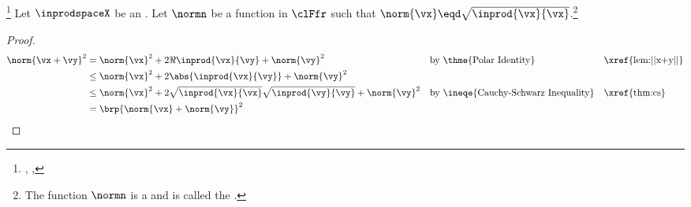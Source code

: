 \begin{theorem}
\footnote{
  ,
  ,
  }
Let $\inprodspaceX$ be an .
Let $\normn$ be a function in $\clFfr$ such that $\norm{\vx}\eqd\sqrt{\inprod{\vx}{\vx}}$.\footnote{
The function $\normn$ is a   and is called the 
.}
\thmbox{
  \norm{\vx+\vy} \le \norm{\vx}+\norm{\vy}
  \quad\sst
  \forall \vx,\vy\in\setX
  }
\end{theorem}
\begin{proof}
  \begin{align*}
    \norm{\vx+\vy}^2
      &=    \norm{\vx}^2 +2\Re{\inprod{\vx}{\vy}} + \norm{\vy}^2
      &&    \text{by \thme{Polar Identity}}
      &&    \text{\xref{lem:||x+y||}}
    \\&\le  \norm{\vx}^2 + 2\abs{\inprod{\vx}{\vy}} +\norm{\vy}^2
    \\&\le  \norm{\vx}^2 + 2\sqrt{\inprod{\vx}{\vx}} \sqrt{\inprod{\vy}{\vy}} + \norm{\vy}^2
      &&    \text{by \ineqe{Cauchy-Schwarz Inequality}}
      &&    \text{\xref{thm:cs}}
    \\&=    \brp{\norm{\vx} + \norm{\vy}}^2
  \end{align*}
\end{proof}

